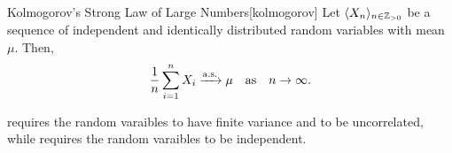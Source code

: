 \documentclass[../probability.tex]{subfiles}
\begin{document}
\begin{Theorem}{Kolmogorov's Strong Law of Large Numbers}[kolmogorov]
    Let \(\lang X_n \rang_{n \in \ZZ_{>0}}\) be a sequence of independent and identically
    distributed random variables with mean \(\mu\). Then,
    \[
        \frac{1}{n}\sum_{i=1}^n X_i \xrightarrow{\mathrm{a.s.}} \mu\quad\text{as}\quad n \to \infty\text.
    \]
\end{Theorem}

\begin{note}
     requires the random varaibles to have finite variance and to be
    uncorrelated, while  requires the random varaibles to be independent.
\end{note}
\end{document}

